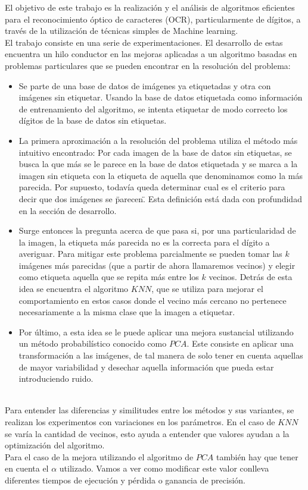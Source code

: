 El objetivo de este trabajo es la realización y el análisis de algoritmos eficientes para el reconocimiento óptico de caracteres (OCR), particularmente de dígitos,  a través de la utilización de técnicas simples de Machine learning.
\\
El trabajo consiste en una serie de experimentaciones. El desarrollo de estas encuentra un hilo conductor en las mejoras aplicadas a un algoritmo basadas en problemas particulares que se pueden encontrar en la resolución del problema: 

\begin{itemize}

  \item Se parte de una base de datos de imágenes ya etiquetadas y otra con imágenes sin etiquetar. Usando la base de datos etiquetada como información de entrenamiento del algoritmo, se intenta etiquetar de modo correcto los dígitos de la base de datos sin etiquetas.

  \item La primera aproximación a la resolución del problema utiliza el método más intuitivo encontrado: Por cada imagen de la base de datos sin etiquetas, se busca la que más se le parece en la base de datos etiquetada y se marca a la imagen sin etiqueta con la etiqueta de aquella que denominamos como la más parecida. Por supuesto, todavía queda determinar cual es el criterio para decir que dos imágenes se \"parecen\". Esta definición está dada con profundidad en la sección de desarrollo.

  \item Surge entonces la pregunta acerca de que pasa si, por una particularidad de la imagen, la etiqueta más parecida no es la correcta para el dígito a averiguar. Para mitigar este problema parcialmente se pueden tomar las $k$ imágenes más parecidas (que a partir de ahora llamaremos vecinos) y elegir como etiqueta aquella que se repita más entre los $k$ vecinos. Detrás de esta idea se encuentra el algoritmo $KNN$, que se utiliza para mejorar el comportamiento en estos casos donde el vecino más cercano no pertenece necesariamente a la misma clase que la imagen a etiquetar.

  \item Por último, a esta idea se le puede aplicar una mejora sustancial utilizando un método probabilístico conocido como $PCA$. Este consiste en aplicar una transformación a las imágenes, de tal manera de solo tener en cuenta aquellas de mayor variabilidad y desechar aquella información que pueda estar introduciendo ruido.

\end{itemize}

\\
Para entender las diferencias y similitudes entre los métodos y sus variantes, se realizan los experimentos con variaciones en los parámetros. En el caso de
$KNN$ se varía la cantidad de vecinos, esto ayuda a entender que valores ayudan a la optimización del algoritmo.
\\
Para el caso de la mejora utilizando el algoritmo de $PCA$ también hay que tener en cuenta el $\alpha$ utilizado. Vamos a ver como modificar este valor
conlleva diferentes tiempos de ejecución y pérdida o ganancia de precisión.
